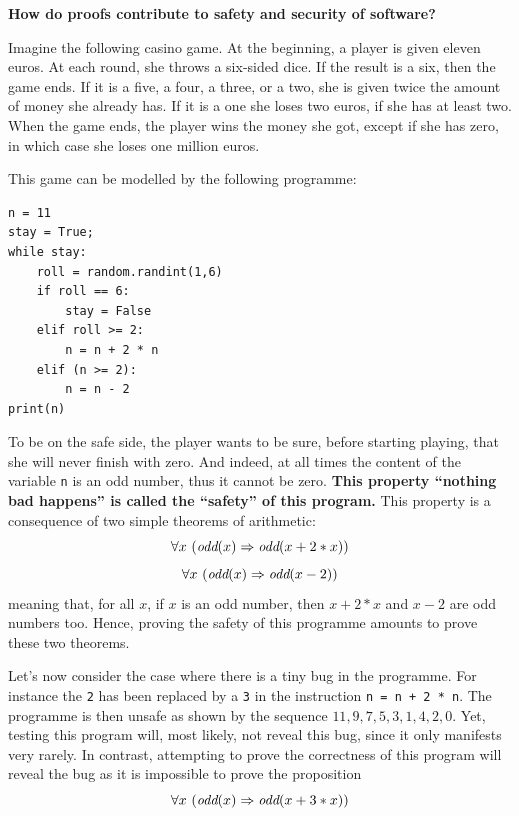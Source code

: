 \begin{framed}
\vspace*{-0.5cm}
\begin{center}
{\bf \Large How do proofs contribute to safety and security of software?}
\end{center}

Imagine the following casino game. At the beginning, a player is given
eleven euros. At each round, she throws a six-sided dice. If the
result is a six, then the game ends.  If it is a five, a four, a
three, or a two, she is given twice the amount of money she already
has. If it is a one she loses two euros, if she has at least two.
When the game ends, the player wins the money she got, except if she
has zero, in which case she loses one million euros.

This game can be modelled by the following programme:
\begin{center}
\begin{minipage}{10cm}
\begin{verbatim}
n = 11
stay = True;
while stay:
    roll = random.randint(1,6)
    if roll == 6:
        stay = False
    elif roll >= 2:
        n = n + 2 * n
    elif (n >= 2):
        n = n - 2
print(n)
\end{verbatim}
\end{minipage}
\end{center}

To be on the safe side, the player wants to be sure, before starting
playing, that she will never finish with zero.  And indeed, at all times
the content of the variable {\tt n} is an odd number,
thus it cannot be zero. {\bf This property ``nothing bad happens'' is
called the ``safety'' of this program.} This property is a
consequence of two simple theorems of arithmetic:
$$\forall x~(\mbox{\it odd}(x) \Rightarrow \mbox{\it odd}(x + 2 * x))$$
$$\forall x~(\mbox{\it odd}(x) \Rightarrow \mbox{\it odd}(x - 2))$$
meaning that, for all $x$, if $x$ is an odd number, then $x+2*x$ and $x-2$ are odd numbers too.
Hence, proving the safety of this programme amounts to prove these two
theorems.

Let's now consider the case where there is a tiny bug in the
programme. For instance the {\tt 2} has been replaced by a {\tt 3} in
the instruction {\tt n = n + 2 * n}. The programme is then unsafe as
shown by the sequence $11, 9, 7, 5, 3, 1, 4, 2, 0$. Yet, testing this
program will, most likely, not reveal this bug, since it only
manifests very rarely.  In contrast, attempting to prove the
correctness of this program will reveal the bug as it is impossible to
prove the proposition
$$\forall x~(\mbox{\it odd}(x) \Rightarrow \mbox{\it odd}(x + 3 * x))$$
\end{framed}

